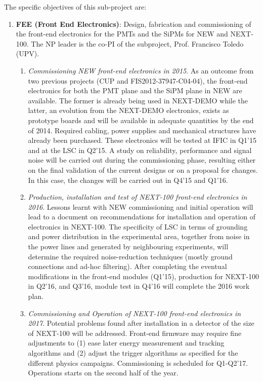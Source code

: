 The specific objectives of this sub-project are:

\begin{enumerate}

\item {\bf FEE (Front End Electronics)}: Design, fabrication and commissioning of the front-end electronics for the PMTs and the SiPMs for NEW and NEXT-100. The NP leader is the co-PI of the subproject, Prof. Francisco Toledo (UPV).
\begin{enumerate}
\item	{\em Commissioning NEW front-end electronics in 2015}. As an outcome from two previous projects (CUP and FIS2012-37947-C04-04), the front-end electronics for both the PMT plane and the SiPM plane in NEW are available. The former is already being used in NEXT-DEMO while the latter, an evolution from the NEXT-DEMO electronics, exists as prototype boards and will be available in adequate quantities by the end of 2014. Required cabling, power supplies and mechanical structures have already been purchased.
These electronics will be tested at IFIC in Q1’15 and at the LSC in Q2’15. A study on reliability, performance and signal noise will be carried out during the commissioning phase, resulting either on the final validation of the current designs or on a proposal for changes. In this case, the changes will be carried out in Q4’15 and Q1’16.

\item {\em Production, installation and test of NEXT-100 front-end electronics in 2016}. Lessons learnt with NEW commissioning and initial operation will lead to a document on recommendations for installation and operation of electronics in NEXT-100. The specificity of LSC in terms of grounding and power distribution in the experimental area, together from noise in the power lines and generated by neighbouring experiments, will determine the required noise-reduction techniques (mostly ground connections and ad-hoc filtering). After completing the eventual modifications in the front-end modules (Q1'15), production for NEXT-100 in Q2’16, and Q3'16, module test in Q4’16 will complete the 2016 work plan.

\item {\em Commissioning and Operation of NEXT-100 front-end electronics in 2017}. Potential problems found after installation in a detector of the size of NEXT-100 will be addressed. Front-end firmware may require fine adjustments to (1) ease later energy measurement and tracking algorithms and (2) adjust the trigger algorithms as specified for the different physics campaigns. Commissioning is scheduled for Q1-Q2’17. Operations starts on the second half of the year.
\end{enumerate}
 

\end{enumerate}
